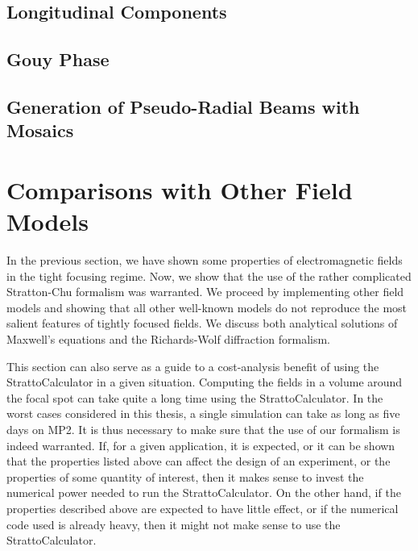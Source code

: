 \documentclass[11pt,SymmetricalJury]{inrsthesis/inrsthesis}
\begin{document}
\subsection{Longitudinal Components}


\subsection{Gouy Phase}


\subsection{Generation of Pseudo-Radial Beams with Mosaics}



\section{Comparisons with Other Field Models}

In the previous section, we have shown some properties of electromagnetic fields
in the tight focusing regime. Now, we show that the use of the rather
complicated Stratton-Chu formalism was warranted. We proceed by implementing
other field models and showing that all other well-known models do not reproduce
the most salient features of tightly focused fields. We discuss both analytical
solutions of Maxwell's equations and the Richards-Wolf diffraction formalism.

This section can also serve as a guide to a cost-analysis benefit of using the
StrattoCalculator in a given situation. Computing the fields in a volume around
the focal spot can take quite a long time using the StrattoCalculator. In the
worst cases considered in this thesis, a single simulation can take as long as
five days on MP2. It is thus necessary to make sure that the use of our
formalism is indeed warranted. If, for a given application, it is expected, or
it can be shown that the properties listed above can affect the design of an
experiment, or the properties of some quantity of interest, then it makes sense
to invest the numerical power needed to run the StrattoCalculator. On the other
hand, if the properties described above are expected to have little effect, or
if the numerical code used is already heavy, then it might not make sense to use
the StrattoCalculator.
\end{document}
